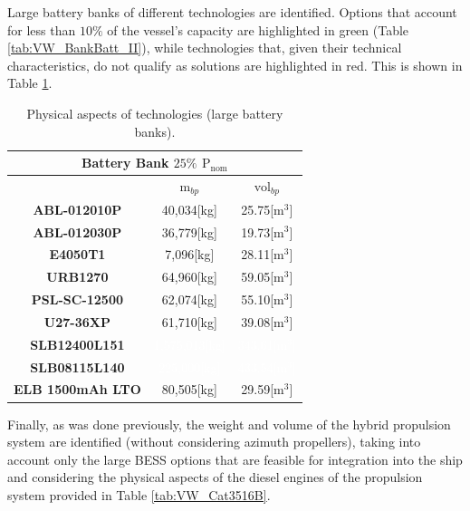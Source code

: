 Large battery banks of different technologies are identified. Options that account for less than $10\%$ of the vessel's capacity are highlighted in green (Table \ref{tab:VW_BankBatt_II}), while technologies that, given their technical characteristics, do not qualify as solutions are highlighted in red. This is shown in Table \ref{tab:VW_techbatts_025}.


\begin{table}[H]
	\centering
	\caption{Physical aspects of technologies (large battery banks).}
	\label{tab:VW_techbatts_025}
	\begin{tabular}{|c|c|c|}
		\hline
		\multicolumn{3}{|c|}{Battery Bank $25\%$ ${\text{P}}_{\text{nom}}$} \\
		\hline\hline
		 &  $\text{m}_{bp}$ & $\text{vol}_{bp}$\\
		 \hline
		 \textbf{ABL-012010P} &  40,034[kg]  & 25.75[${\text{m}}^{3}$] \\
		 \hline	
		 \textbf{ABL-012030P} & 36,779[kg]  & 19.73[${\text{m}}^{3}$] \\
		 \hline
		 \textbf{E4050T1} & \cellcolor[HTML]{81DE76}7,096[kg] & 28.11[${\text{m}}^{3}$] \\
		 \hline\hline
		 
		 \textbf{URB1270} &  64,960[kg]  &  59.05[${\text{m}}^{3}$] \\
		 \hline
		 \textbf{PSL-SC-12500} & 62,074[kg]  & 55.10[${\text{m}}^{3}$] \\
		 \hline
		 \textbf{U27-36XP} & 61,710[kg]  & 39.08[${\text{m}}^{3}$] \\
		 \hline\hline
		 
		 \textbf{SLB12400L151} & {\cellcolor[HTML]{CC444B}} \textcolor{white}{1,575,013[kg]} & {\cellcolor[HTML]{CC444B}} \textcolor{white}{343.61[${\text{m}}^{3}$]} \\
		 \hline
		 \textbf{SLB08115L140} &  {\cellcolor[HTML]{CC444B}} \textcolor{white}{225,000[kg]}  & {\cellcolor[HTML]{CC444B}} \textcolor{white}{433.54[${\text{m}}^{3}$]} \\
		 \hline
		 \textbf{ELB 1500mAh LTO} & 80,505[kg]  & 29.59[${\text{m}}^{3}$] \\
		 \hline	
	\end{tabular}
\end{table}


Finally, as was done previously, the weight and volume of the hybrid propulsion system are identified (without considering azimuth propellers), taking into account only the large BESS options that are feasible for integration into the ship and considering the physical aspects of the diesel engines of the propulsion system provided in Table \ref{tab:VW_Cat3516B}.
	
